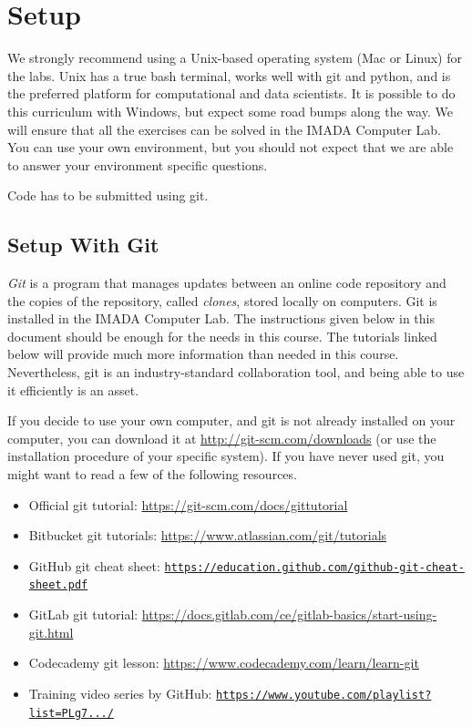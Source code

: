 \newpage
\section*{Setup} %

\begin{warn}
We strongly recommend using a Unix-based operating system (Mac or Linux) for the labs.
Unix has a true bash terminal, works well with git and python, and is the preferred platform for computational and data scientists.
It is possible to do this curriculum with Windows, but expect some road bumps along the way. We will ensure that all the exercises can be solved in the IMADA Computer Lab. You can use your own environment, but you should not expect that we are able to answer your environment specific questions.
\end{warn}

Code has to be submitted using git. 

\subsection*{Setup With Git} %

\emph{Git} is a program that manages updates between an online code
repository and the copies of the repository, called \emph{clones},
stored locally on computers. Git is installed in the IMADA Computer
Lab. The instructions given below in this document should be enough for
the needs in this course. The tutorials linked below will provide much
more information than needed in this course. Nevertheless, git is an industry-standard collaboration tool, and being able to use it efficiently is an asset.

If you decide to use your own computer, and git is not already installed on your computer, you can download it at \url{http://git-scm.com/downloads} (or use the installation procedure of your specific system).
If you have never used git, you might want to read a few of the following resources.
\begin{itemize}
\item Official git tutorial: \url{https://git-scm.com/docs/gittutorial}
\item Bitbucket git tutorials: \url{https://www.atlassian.com/git/tutorials}
\item GitHub git cheat sheet: \href{https://education.github.com/git-cheat-sheet-education.pdf}{\texttt{https://education.github.com/github-git-cheat-sheet.pdf}}
\item GitLab git tutorial: \url{https://docs.gitlab.com/ce/gitlab-basics/start-using-git.html}
\item Codecademy git lesson: \url{https://www.codecademy.com/learn/learn-git}
\item Training video series by GitHub: \href{https://www.youtube.com/playlist?list=PLg7s6cbtAD15G8lNyoaYDuKZSKyJrgwB-}{\texttt{https://www.youtube.com/playlist?list=PLg7.../}}
\end{itemize}


